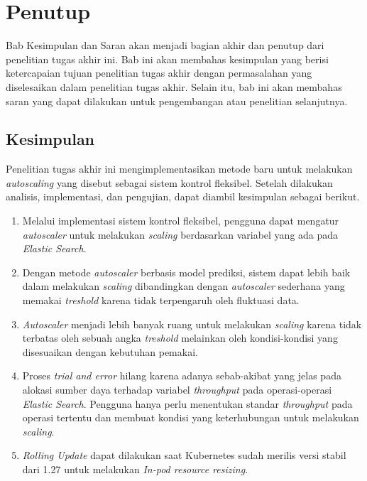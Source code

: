 \chapter{Penutup}

Bab Kesimpulan dan Saran akan menjadi bagian akhir dan penutup dari penelitian tugas akhir ini. Bab ini akan membahas kesimpulan yang berisi ketercapaian tujuan penelitian tugas akhir dengan permasalahan yang diselesaikan dalam penelitian tugas akhir. Selain itu, bab ini akan membahas saran yang dapat dilakukan untuk pengembangan atau penelitian selanjutnya.

\section{Kesimpulan}
Penelitian tugas akhir ini mengimplementasikan metode baru untuk melakukan \textit{autoscaling} yang disebut sebagai sistem kontrol fleksibel. Setelah dilakukan analisis, implementasi, dan pengujian, dapat diambil kesimpulan sebagai berikut.
\begin{enumerate}
    \item Melalui implementasi sistem kontrol fleksibel, pengguna dapat mengatur \textit{autoscaler} untuk melakukan \textit{scaling} berdasarkan variabel yang ada pada \textit{Elastic Search}.
    \item Dengan metode \textit{autoscaler} berbasis model prediksi, sistem dapat lebih baik dalam melakukan \textit{scaling} dibandingkan dengan \textit{autoscaler} sederhana yang memakai \textit{treshold} karena tidak terpengaruh oleh fluktuasi data.
    \item \textit{Autoscaler} menjadi lebih banyak ruang untuk melakukan \textit{scaling} karena tidak terbatas oleh sebuah angka \textit{treshold} melainkan oleh kondisi-kondisi yang disesuaikan dengan kebutuhan pemakai.
    \item Proses \textit{trial and error} hilang karena adanya sebab-akibat yang jelas pada alokasi sumber daya terhadap variabel \textit{throughput} pada operasi-operasi \textit{Elastic Search}. Pengguna hanya perlu menentukan standar \textit{throughput} pada operasi tertentu dan membuat kondisi yang keterhubungan untuk melakukan \textit{scaling}.
    \item \textit{Rolling Update} dapat dilakukan saat Kubernetes sudah merilis versi stabil dari 1.27 untuk melakukan \textit{In-pod resource resizing}.
\end{enumerate}

